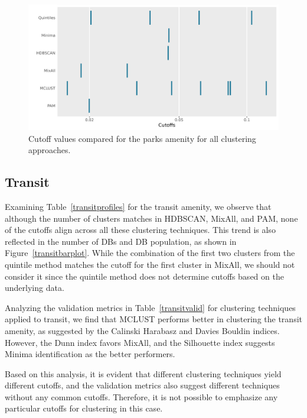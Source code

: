\documentclass[11pt, a4paper]{article}
\begin{document}
\begin{figure}[H]
\centering
\includegraphics[width=\textwidth]{./cutoff_ticks/Parks_ticks.png}
\caption[Parks cutoff comparison]{Cutoff values compared for the parks amenity for all clustering approaches.}\label{parksticks}
\end{figure}









\pagebreak
\justifying
\subsection{Transit}

Examining Table~\ref{transitprofiles} for the transit amenity, we observe that although the number of clusters matches in HDBSCAN, MixAll, and PAM, none of the cutoffs align across all these clustering techniques. This trend is also reflected in the number of DBs and DB population, as shown in Figure~\ref{transitbarplot}. While the combination of the first two clusters from the quintile method matches the cutoff for the first cluster in MixAll, we should not consider it since the quintile method does not determine cutoffs based on the underlying data.
\par
Analyzing the validation metrics in Table~\ref{transitvalid} for clustering techniques applied to transit, we find that MCLUST performs better in clustering the transit amenity, as suggested by the Calinski Harabasz and Davies Bouldin indices. However, the Dunn index favors MixAll, and the Silhouette index suggests Minima identification as the better performers.
\par
Based on this analysis, it is evident that different clustering techniques yield different cutoffs, and the validation metrics also suggest different techniques without any common cutoffs. Therefore, it is not possible to emphasize any particular cutoffs for clustering in this case.
\end{document}
